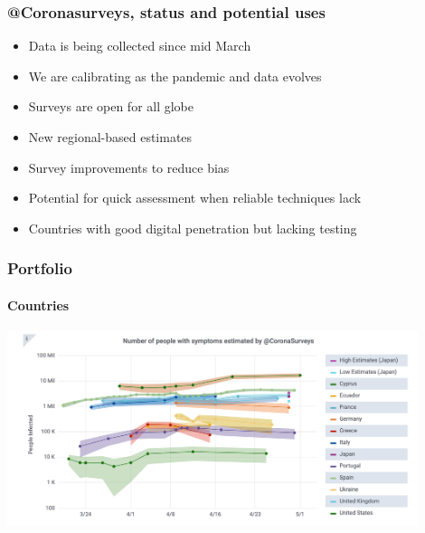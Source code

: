 \documentclass{beamer}
\begin{document}
\begin{frame}
  \frametitle{@Coronasurveys, status and potential uses}
  \begin{itemize}
    \item Data is being collected since mid March
    \item We are calibrating as the pandemic and data evolves
    \item Surveys are open for all globe
    \item New regional-based estimates
    \item Survey improvements to reduce bias
  \end{itemize}
  \begin{itemize}
    \item Potential for quick assessment when reliable techniques lack 
    \item Countries with good digital penetration but lacking testing
  \end{itemize}

\end{frame}

\begin{frame}
  \frametitle{Portfolio}
  \framesubtitle{Countries}
  \begin{center}
  \includegraphics[width=0.9\textwidth]{allcountries.png}
  \end{center}
\end{frame}


\end{document}
